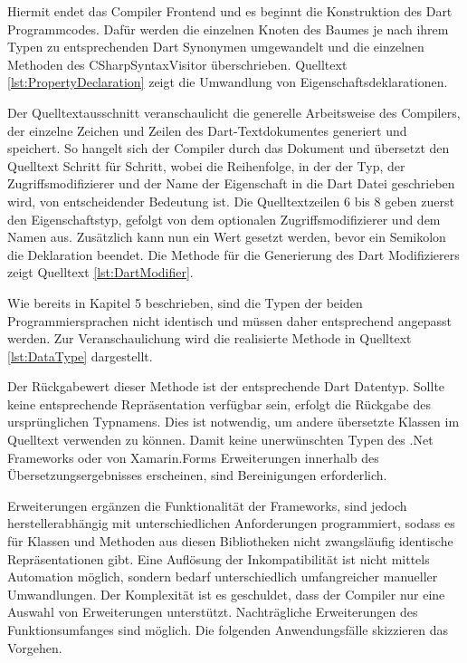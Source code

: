 Hiermit endet das Compiler Frontend und es beginnt die Konstruktion des Dart Programmcodes.  Dafür werden die einzelnen Knoten des Baumes je nach ihrem Typen zu entsprechenden Dart Synonymen umgewandelt und die einzelnen Methoden des \glq CSharpSyntaxVisitor\grq{} überschrieben.  Quelltext \ref{lst:PropertyDeclaration} zeigt die Umwandlung von Eigenschaftsdeklarationen.
\newpage


Der Quelltextausschnitt veranschaulicht die generelle Arbeitsweise des Compilers,  der einzelne Zeichen und Zeilen des Dart-Textdokumentes generiert und speichert.  So hangelt sich der Compiler durch das Dokument und übersetzt den Quelltext Schritt für Schritt, wobei die Reihenfolge, in der der Typ, der Zugriffsmodifizierer und der Name der Eigenschaft in die Dart Datei geschrieben wird,  von entscheidender Bedeutung ist.  Die Quelltextzeilen 6 bis 8 geben zuerst den Eigenschaftstyp,  gefolgt von dem optionalen Zugriffsmodifizierer und dem Namen aus.  Zusätzlich kann nun ein Wert gesetzt werden,  bevor ein Semikolon die Deklaration beendet.  Die Methode für die Generierung des Dart Modifizierers zeigt Quelltext \ref{lst:DartModifier}.




Wie bereits in Kapitel 5 beschrieben,  sind die Typen der beiden Programmiersprachen nicht identisch und müssen daher entsprechend angepasst werden.  Zur Veranschaulichung wird die realisierte Methode in Quelltext \ref{lst:DataType} dargestellt. 


Der Rückgabewert dieser Methode ist der entsprechende Dart Datentyp.  Sollte keine entsprechende Repräsentation verfügbar sein,  erfolgt die Rückgabe des ursprünglichen Typnamens.  Dies ist notwendig,  um andere übersetzte Klassen im Quelltext verwenden zu können.  Damit keine unerwünschten Typen des .Net Frameworks oder von Xamarin.Forms Erweiterungen innerhalb des Übersetzungsergebnisses erscheinen, sind Bereinigungen erforderlich. 

Erweiterungen ergänzen die Funktionalität der Frameworks,  sind jedoch herstellerabhängig mit unterschiedlichen Anforderungen programmiert,  sodass es für Klassen und Methoden aus diesen Bibliotheken nicht zwangsläufig identische Repräsentationen gibt.  Eine Auflösung der Inkompatibilität ist nicht mittels Automation möglich, sondern bedarf unterschiedlich umfangreicher manueller Umwandlungen.  Der Komplexität ist es geschuldet,  dass der Compiler nur eine Auswahl von Erweiterungen unterstützt.  Nachträgliche Erweiterungen des Funktionsumfanges sind möglich.  Die folgenden Anwendungsfälle skizzieren das Vorgehen.  

